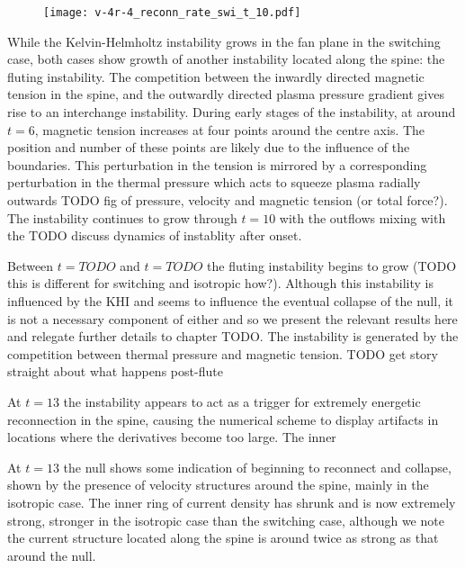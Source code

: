 \begin{figure}[t]
  \centering
  \texttt{[image: v-4r-4\_reconn\_rate\_swi\_t\_10.pdf]}
  \caption{}%
  \label{fig:v-4r-4_reconn_rate_swi_t_10}
\end{figure}

While the Kelvin-Helmholtz instability grows in the fan plane in the switching case, both cases show growth of another instability located along the spine: the fluting instability. The competition between the inwardly directed magnetic tension in the spine, and the outwardly directed plasma pressure gradient gives rise to an interchange instability. During early stages of the instability, at around $t=6$, magnetic tension increases at four points around the centre axis. The position and number of these points are likely due to the influence of the boundaries. This perturbation in the tension is mirrored by a corresponding perturbation in the thermal pressure which acts to squeeze plasma radially outwards TODO fig of pressure, velocity and magnetic tension (or total force?). The instability continues to grow through $t=10$ with the outflows mixing with the TODO discuss dynamics of instablity after onset. 

Between $t=TODO$ and $t=TODO$ the fluting instability begins to grow (TODO this is different for switching and isotropic how?). Although this instability is influenced by the KHI and seems to influence the eventual collapse of the null, it is not a necessary component of either and so we present the relevant results here and relegate further details to chapter TODO. The instability is generated by the competition between thermal pressure and magnetic tension. 
TODO get story straight about what happens post-flute

At $t=13$ the instability appears to act as a trigger for extremely energetic reconnection in the spine, causing the numerical scheme to display artifacts in locations where the derivatives become too large. The inner

At $t=13$ the null shows some indication of beginning to reconnect and collapse, shown by the presence of velocity structures around the spine, mainly in the isotropic case. The inner ring of current density has shrunk and is now extremely strong, stronger in the isotropic case than the switching case, although we note the current structure located along the spine is around twice as strong as that around the null.


